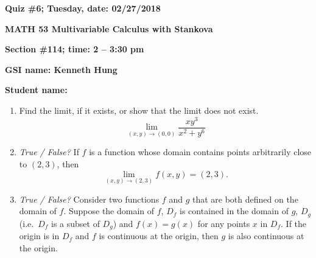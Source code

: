\documentclass{article}
\begin{document}
{\bf Quiz \#6; Tuesday, date: 02/27/2018}

{\bf MATH 53 Multivariable Calculus with Stankova}

{\bf Section \#114; time: 2 -- 3:30 pm}

{\bf GSI name: Kenneth Hung}

{\bf Student name:}

\vspace*{0.25in}

\begin{enumerate}
\item Find the limit, if it exists, or show that the limit does not exist.
\[
\lim_{(x, y) \to (0, 0)} \frac{xy^3}{x^2 + y^6}
\]

\item {\em True / False?} If $f$ is a function whose domain contains points arbitrarily close to $(2, 3)$, then
\[
\lim_{(x, y) \to (2, 3)} f(x, y) = (2, 3).
\]

\item {\em True / False?} Consider two functions $f$ and $g$ that are both defined on the domain of $f$.  Suppose the domain of $f$, $D_f$ is contained in the domain of $g$, $D_g$ (i.e.\ $D_f$ is a subset of $D_g$) and $f(x) = g(x)$ for any points $x$ in $D_f$. If the origin is in $D_f$ and $f$ is continuous at the origin, then $g$ is also continuous at the origin.
\end{enumerate}
\end{document}
